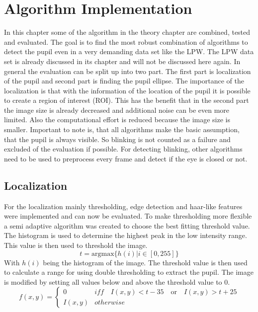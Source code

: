 \chapter{Algorithm Implementation}
In this chapter some of the algorithm in the theory chapter are combined, tested and evaluated. The goal is to find the most robust combination of algorithms to detect the pupil even in a very demanding data set like the LPW. The LPW data set is already discussed in its chapter and will not be discussed here again. In general the evaluation can be split up into two part. The first part is localization of the pupil and second part is finding the pupil ellipse. The importance of the localization is that with the information of the location of the pupil it is possible to create a region of interest (ROI). This has the benefit that in the second part the image size is already decreased and additional noise can be even more limited. Also the computational effort is reduced because the image size is smaller. Important to note is, that all algorithms make the basic assumption, that the pupil is always visible. So blinking is not counted as a failure and excluded of the evaluation if possible. For detecting blinking, other algorithms need to be used to preprocess every frame and detect if the eye is closed or not. 


\section{Localization}
For the localization mainly thresholding, edge detection and haar-like features were implemented and can now be evaluated. To make thresholding more flexible a semi adaptive algorithm was created to choose the best fitting threshold value. The histogram is used to determine the highest peak in the low intensity range. This value is then used to threshold the image. 
\begin{equation}
    t = \text{argmax} \{h(i) | i \in [0,255]\}
\end{equation}
With $h(i)$ being the histogram of the image. The threshold value is then used to calculate a range for using double thresholding to extract the pupil. The image is modified by setting all values below and above the threshold value to 0. 
\begin{equation}
    f(x,y)= \begin{cases}
        0 &iff \quad I(x,y) < t-35 \quad \text{or} \quad I(x,y) > t+25 \\
        I(x,y) &otherwise
    \end{cases}
\end{equation}
